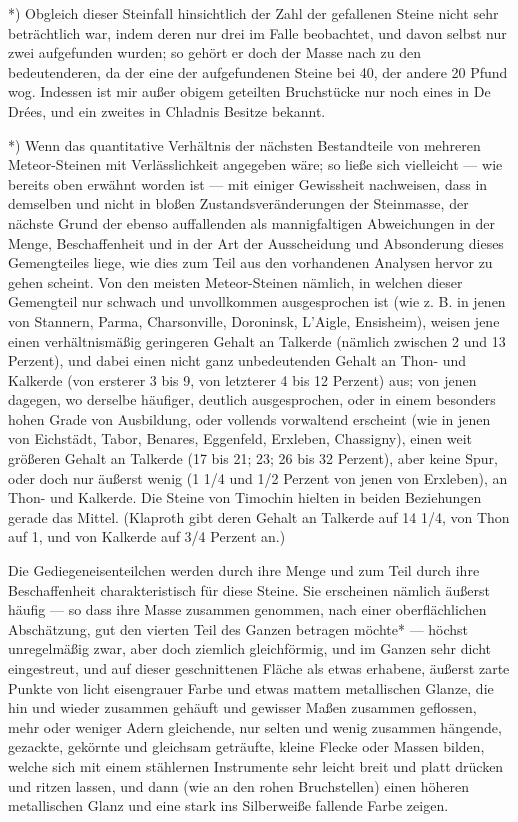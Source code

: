 \documentclass[a4paper, 11pt, oneside, german]{article}
\begin{document}
*) Obgleich dieser Steinfall hinsichtlich der Zahl der gefallenen Steine nicht sehr beträchtlich war, indem deren nur drei im Falle beobachtet, und davon selbst nur zwei aufgefunden wurden; so gehört er doch der Masse nach zu den bedeutenderen, da der eine der aufgefundenen Steine bei 40, der andere 20 Pfund wog. Indessen ist mir außer obigem geteilten Bruchstücke nur noch eines in De Drées, und ein zweites in Chladnis Besitze bekannt.

*) Wenn das quantitative Verhältnis der nächsten Bestandteile von mehreren Meteor-Steinen mit Verlässlichkeit angegeben wäre; so ließe sich vielleicht --- wie bereits oben erwähnt worden ist --- mit einiger Gewissheit nachweisen, dass in demselben und nicht in bloßen Zustandsveränderungen der Steinmasse, der nächste Grund der ebenso auffallenden als mannigfaltigen Abweichungen in der Menge, Beschaffenheit und in der Art der Ausscheidung und Absonderung dieses Gemengteiles liege, wie dies zum Teil aus den vorhandenen Analysen hervor zu gehen scheint. Von den meisten Meteor-Steinen nämlich, in welchen dieser Gemengteil nur schwach und unvollkommen ausgesprochen ist (wie z. B. in jenen von Stannern, Parma, Charsonville, Doroninsk, L'Aigle, Ensisheim), weisen jene einen verhältnismäßig geringeren Gehalt an Talkerde (nämlich zwischen 2 und 13 Perzent), und dabei einen nicht ganz unbedeutenden Gehalt an Thon- und Kalkerde (von ersterer 3 bis 9, von letzterer 4 bis 12 Perzent) aus; von jenen dagegen, wo derselbe häufiger, deutlich ausgesprochen, oder in einem besonders hohen Grade von Ausbildung, oder vollends vorwaltend erscheint (wie in jenen von Eichstädt, Tabor, Benares, Eggenfeld, Erxleben, Chassigny), einen weit größeren Gehalt an Talkerde (17 bis 21; 23; 26 bis 32 Perzent), aber keine Spur, oder doch nur äußerst wenig (1 1/4 und 1/2 Perzent von jenen von Erxleben), an Thon- und Kalkerde. Die Steine von Timochin hielten in beiden Beziehungen gerade das Mittel. (Klaproth gibt deren Gehalt an Talkerde auf 14 1/4, von Thon auf 1, und von Kalkerde auf 3/4 Perzent an.)

Die Gediegeneisenteilchen werden durch ihre Menge und zum Teil durch ihre Beschaffenheit charakteristisch für diese Steine. Sie erscheinen nämlich äußerst häufig --- so dass ihre Masse zusammen genommen, nach einer oberflächlichen Abschätzung, gut den vierten Teil des Ganzen betragen möchte* --- höchst unregelmäßig zwar, aber doch ziemlich gleichförmig, und im Ganzen sehr dicht eingestreut, und auf dieser geschnittenen Fläche als etwas erhabene, äußerst zarte Punkte von licht eisengrauer Farbe und etwas mattem metallischen Glanze, die hin und wieder zusammen gehäuft und gewisser Maßen zusammen geflossen, mehr oder weniger Adern gleichende, nur selten und wenig zusammen hängende, gezackte, gekörnte und gleichsam geträufte, kleine Flecke oder Massen bilden, welche sich mit einem stählernen Instrumente sehr leicht breit und platt drücken und ritzen lassen, und dann (wie an den rohen Bruchstellen) einen höheren metallischen Glanz und eine stark ins Silberweiße fallende Farbe zeigen.
\end{document}
